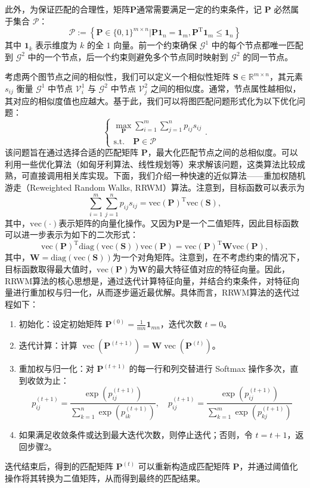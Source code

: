 此外，为保证匹配的合理性，矩阵\( \mathbf{P} \)通常需要满足一定的约束条件，记 $\mathbf{P}$ 必然属于集合 $\mathcal{P}$：
\[
    \mathcal{P} := \left\{ \mathbf{P} \in \{0,1\}^{m \times n} | \mathbf{P} \mathbf{1}_n = \mathbf{1}_m, \mathbf{P}^{\mathrm{T}} \mathbf{1}_m \leq \mathbf{1}_n \right\}
\]
其中 $\mathbf{1}_k$ 表示维度为 $k$ 的全 $1$ 向量。前一个约束确保 $\mathcal G^1$ 中的每个节点都唯一匹配到 $\mathcal G^2$ 中的一个节点，后一个约束则避免多个节点同时映射到 $\mathcal G^2$ 的同一节点。

考虑两个图节点之间的相似性，我们可以定义一个相似性矩阵 $\mathbf{S} \in \mathbb R^{m \times n}$，其元素 $s_{ij}$ 衡量 $\mathcal G^1$ 中节点 $\mathcal V^1_i$ 与 $\mathcal G^2$ 中节点 $\mathcal V^2_j$ 之间的相似度。通常，节点属性越相似，其对应的相似度值也应越大。基于此，我们可以将图匹配问题形式化为以下优化问题：
\[
    \begin{cases}
        \max_{\mathbf{P}} \sum_{i=1}^{m} \sum_{j=1}^{n} p_{ij} s_{ij} \\
        \text{s.t.} \quad \mathbf{P} \in \mathcal{P}
    \end{cases}.
\]
该问题旨在通过选择合适的匹配矩阵 $\mathbf{P}$，最大化匹配节点之间的总相似度。可以利用一些优化算法（如匈牙利算法、线性规划等）来求解该问题，这类算法比较成熟，可直接调用相关库实现。下面，我们介绍一种快速的近似算法——重加权随机游走（Reweighted Random Walks, RRWM）算法。注意到，目标函数可以表示为
\[
    \sum_{i=1}^{m} \sum_{j=1}^{n} p_{ij} s_{ij} = \mathrm{vec}(\mathbf{P})^{\mathrm{T}} \mathrm{vec}(\mathbf{S}),
\]
其中，\( \mathrm{vec}(\cdot) \)表示矩阵的向量化操作。又因为\( \mathbf{P} \)是一个二值矩阵，因此目标函数可以进一步表示为如下的二次形式：
\[
    \mathrm{vec}(\mathbf{P})^{\mathrm{T}} \mathrm{diag}(\mathrm{vec}(\mathbf{S})) \mathrm{vec}(\mathbf{P}) = \mathrm{vec}(\mathbf{P})^{\mathrm{T}} \mathbf{W} \mathrm{vec}(\mathbf{P}),
\]
其中，\( \mathbf{W} = \mathrm{diag}(\mathrm{vec}(\mathbf{S})) \)为一个对角矩阵。注意到，在不考虑约束的情况下，目标函数取得最大值时，\( \mathrm{vec}(\mathbf{P}) \)为\( \mathbf{W} \)的最大特征值对应的特征向量。因此，RRWM算法的核心思想是，通过迭代计算特征向量，并结合约束条件，对特征向量进行重加权与归一化，从而逐步逼近最优解。具体而言，RRWM算法的迭代过程如下：
\begin{enumerate}
    \item 初始化：设定初始矩阵 $\mathbf{P}^{(0)} = \frac{1}{mn} \mathbf{1}_{mn}$，迭代次数 $t=0$。
    \item 迭代计算：计算 $\operatorname{vec}(\mathbf{P}^{(t+1)}) = \mathbf{W} \operatorname{vec}(\mathbf{P}^{(t)})$。
    \item 重加权与归一化：对 $\mathbf{P}^{(t+1)}$ 的每一行和列交替进行 Softmax 操作多次，直到收敛为止：
          \[
              p_{ij}^{(t+1)} = \frac{\exp(p_{ij}^{(t+1)})}{\sum_{k=1}^{n} \exp(p_{ik}^{(t+1)})}, \quad p_{ij}^{(t+1)} = \frac{\exp(p_{ij}^{(t+1)})}{\sum_{k=1}^{m} \exp(p_{kj}^{(t+1)})}
          \]
    \item 如果满足收敛条件或达到最大迭代次数，则停止迭代；否则，令 $t = t + 1$，返回步骤2。
\end{enumerate}
迭代结束后，得到的匹配矩阵 $\mathbf{P}^{(t)}$ 可以重新构造成匹配矩阵 $\mathbf{P}$，并通过阈值化操作将其转换为二值矩阵，从而得到最终的匹配结果。

